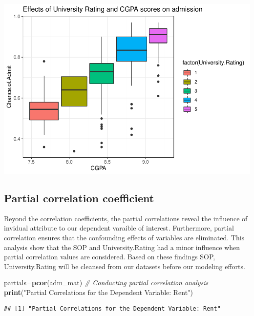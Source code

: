 \documentclass[11pt,]{article}
\newenvironment{Shaded}{\begin{snugshade}}{\end{snugshade}}
\newcommand{\CommentTok}[1]{\textcolor[rgb]{0.56,0.35,0.01}{\textit{#1}}}
\newcommand{\KeywordTok}[1]{\textcolor[rgb]{0.13,0.29,0.53}{\textbf{#1}}}
\newcommand{\NormalTok}[1]{#1}
\newcommand{\StringTok}[1]{\textcolor[rgb]{0.31,0.60,0.02}{#1}}
\begin{document}
\includegraphics{USGradAdmission_files/figure-latex/unnamed-chunk-6-3.pdf}

\hypertarget{partial-correlation-coefficient}{%
\subsection{Partial correlation
coefficient}\label{partial-correlation-coefficient}}

Beyond the correlation coefficients, the partial correlations reveal the
influence of invidual attribute to our dependent varaible of interest.
Furthermore, partial correlation ensures that the confounding effects of
variables are eliminated. This analysis show that the SOP and
University.Rating had a minor influence when partial correlation values
are considered. Based on these findings SOP, University.Rating will be
cleansed from our datasets before our modeling efforts.

\begin{Shaded}
\begin{Highlighting}[]
\NormalTok{partials=}\KeywordTok{pcor}\NormalTok{(adm_mat) }\CommentTok{# Conducting partial correlation analysis}
\KeywordTok{print}\NormalTok{(}\StringTok{"Partial Correlations for the Dependent Variable: Rent"}\NormalTok{)}
\end{Highlighting}
\end{Shaded}

\begin{verbatim}
## [1] "Partial Correlations for the Dependent Variable: Rent"
\end{verbatim}
\end{document}
